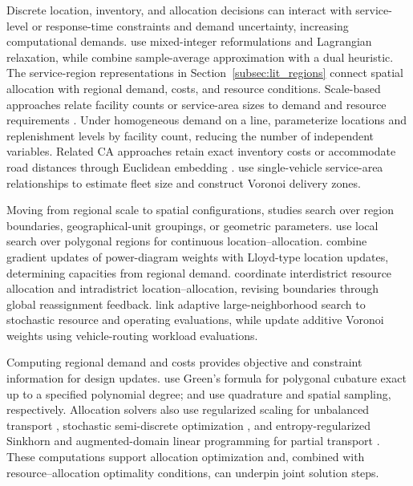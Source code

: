 \documentclass[a4paper,fleqn]{cas-sc}
\theoremstyle{remark}
\theoremstyle{plain}
\begin{document}
Discrete location, inventory, and allocation decisions can interact with service-level or response-time constraints and demand uncertainty, increasing computational demands. \citet{candas2020service} use mixed-integer reformulations and Lagrangian relaxation, while \citet{chu2025integrated} combine sample-average approximation with a dual heuristic. The service-region representations in Section~\ref{subsec:lit_regions} connect spatial allocation with regional demand, costs, and resource conditions. Scale-based approaches relate facility counts or service-area sizes to demand and resource requirements \citep{ansari2018advancements}. Under homogeneous demand on a line, \citet{naseraldin2008integrating} parameterize locations and replenishment levels by facility count, reducing the number of independent variables. Related CA approaches retain exact inventory costs \citep{straubert2024continuous} or accommodate road distances through Euclidean embedding \citep{mizutani2025spare}. \citet{banerjee2022fleet} use single-vehicle service-area relationships to estimate fleet size and construct Voronoi delivery zones.

Moving from regional scale to spatial configurations, studies search over region boundaries, geographical-unit groupings, or geometric parameters. \citet{murat2010continuous} use local search over polygonal regions for continuous location--allocation. \citet{yao2022power} combine gradient updates of power-diagram weights with Lloyd-type location updates, determining capacities from regional demand. \citet{regis2023ems} coordinate interdistrict resource allocation and intradistrict location--allocation, revising boundaries through global reassignment feedback. \citet{bruni2026districting} link adaptive large-neighborhood search to stochastic resource and operating evaluations, while \citet{carlsson2026equitable} update additive Voronoi weights using vehicle-routing workload evaluations.

Computing regional demand and costs provides objective and constraint information for design updates. \citet{sommariva2007gauss} use Green's formula for polygonal cubature exact up to a specified polynomial degree; \citet{bourne2015centroidal} and \citet{chungunbalanced} use quadrature and spatial sampling, respectively. Allocation solvers also use regularized scaling for unbalanced transport \citep{chizat2018scaling}, stochastic semi-discrete optimization \citep{taskesen2023semidiscrete}, and entropy-regularized Sinkhorn and augmented-domain linear programming for partial transport \citep{bai2024generalizedpartial}. These computations support allocation optimization and, combined with resource--allocation optimality conditions, can underpin joint solution steps.
\end{document}
